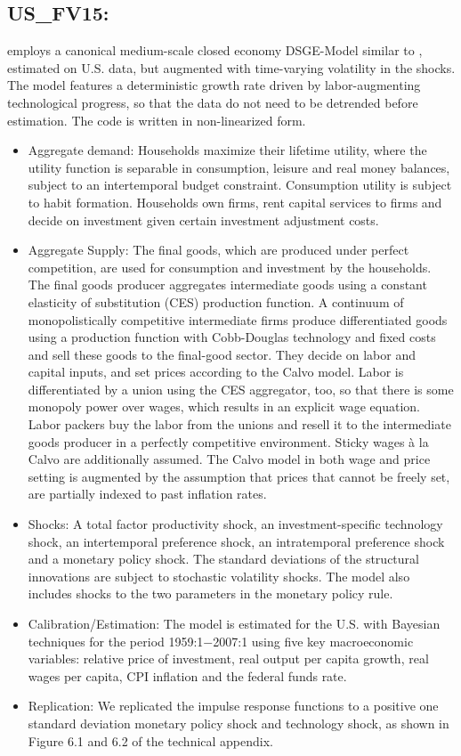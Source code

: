 \documentclass[11pt,a4paper]{article}
\begin{document}
	
	\subsection{US\_FV15: \cite{fernandez2015estimating}}
	\label{USFV15}
	\cite{fernandez2015estimating} employs a canonical medium-scale closed economy DSGE-Model similar to \cite{SmetsWouters2007}, estimated on U.S. data, but augmented with time-varying volatility in the shocks. The model features a deterministic growth rate driven by labor-augmenting technological progress, so that the data do not need to be detrended before estimation. The code is written in non-linearized form. 
	\begin{itemize}
		\item Aggregate demand: Households maximize their lifetime utility, where the utility function is separable in consumption, leisure and real money balances, subject to an intertemporal budget constraint. Consumption utility is subject to habit formation. Households own firms, rent capital services to firms and decide on investment given certain investment adjustment costs. 
		\item Aggregate Supply: The final goods, which are produced under perfect competition, are used for consumption and investment by the households. The final goods producer aggregates intermediate goods using a constant elasticity of substitution (CES) production function. A continuum of monopolistically competitive intermediate firms produce differentiated goods using a production function with Cobb-Douglas technology and fixed costs and sell these goods to the final-good sector. They decide on labor and capital inputs, and set prices according to the Calvo model. Labor is differentiated by a union using the CES aggregator, too, so that there is some monopoly power over wages, which results in an explicit wage equation. Labor packers buy the labor from the unions and resell it to the intermediate goods producer in a perfectly competitive environment. Sticky wages \`{a}  la Calvo are additionally assumed. The Calvo model in both wage and price setting is augmented by the assumption that prices that cannot be freely set, are partially indexed to past inflation rates.
		\item Shocks: A total factor productivity shock, an investment-specific technology shock, an intertemporal preference shock, an intratemporal preference shock and a monetary policy shock. The standard deviations of the structural innovations are subject to stochastic volatility shocks. The model also includes shocks to the two parameters in the monetary policy rule.  
		\item Calibration/Estimation: The model is estimated for the U.S. with Bayesian techniques for the period 1959:1$-$2007:1 using five key macroeconomic variables: relative price of investment, real output per capita growth, real wages per capita, CPI inflation and the federal funds rate. 
		\item Replication: We replicated the impulse response functions to a positive one standard deviation monetary policy shock and technology shock, as shown in Figure 6.1 and 6.2 of the technical appendix.
	\end{itemize}
	
\end{document}

